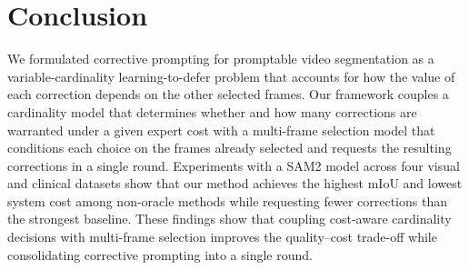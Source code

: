 \section{Conclusion}

We formulated corrective prompting for promptable video segmentation as a variable-cardinality learning-to-defer problem that accounts for how the value of each correction depends on the other selected frames.
Our framework couples a cardinality model that determines whether and how many corrections are warranted under a given expert cost with a multi-frame selection model that conditions each choice on the frames already selected and requests the resulting corrections in a single round. Experiments with a SAM2 model across four visual and clinical datasets show that our method achieves the highest mIoU and lowest system cost among non-oracle methods while requesting fewer corrections than the strongest baseline.
These findings show that coupling cost-aware cardinality decisions with multi-frame selection improves the quality–cost trade-off while consolidating corrective prompting into a single round.
